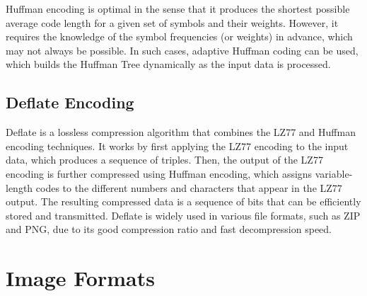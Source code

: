 Huffman encoding is optimal in the sense that it produces the shortest possible average code length for a given set of symbols and their weights. However, it requires the knowledge of the symbol frequencies (or weights) in advance, which may not always be possible. In such cases, adaptive Huffman coding can be used, which builds the Huffman Tree dynamically as the input data is processed.

\subsection{Deflate Encoding}

Deflate is a lossless compression algorithm that combines the LZ77 and Huffman encoding techniques. It works by first applying the LZ77 encoding to the input data, which produces a sequence of triples. Then, the output of the LZ77 encoding is further compressed using Huffman encoding, which assigns variable-length codes to the different numbers and characters that appear in the LZ77 output. The resulting compressed data is a sequence of bits that can be efficiently stored and transmitted. Deflate is widely used in various file formats, such as ZIP and PNG, due to its good compression ratio and fast decompression speed.

\section{Image Formats}

